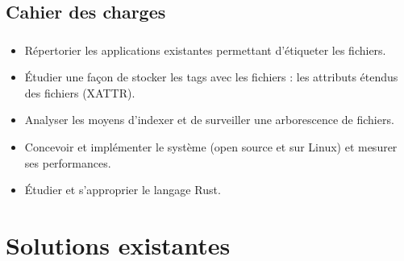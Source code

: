 \documentclass[10pt]{beamer}
\begin{document}
\subsection{Cahier des charges}
\begin{frame}
    \frametitle{\subsecname}
    \begin{itemize}
        \item Répertorier les applications existantes permettant d'étiqueter les fichiers.
        \pause
        \item Étudier une façon de stocker les tags avec les fichiers : les attributs étendus des fichiers (XATTR).
        \pause
        \item Analyser les moyens d'indexer et de surveiller une arborescence de fichiers.
        \pause
        \item Concevoir et implémenter le système (open source et sur Linux) et mesurer ses performances.
        \pause
        \item Étudier et s'approprier le langage Rust.
    \end{itemize}
\end{frame}

\section{Solutions existantes}
\end{document}
